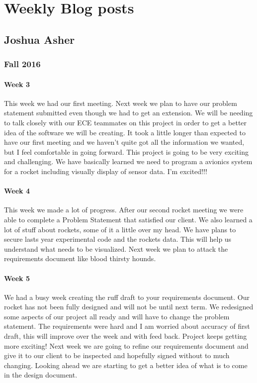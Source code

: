 \documentclass[10pt,draftclsnofoot,onecolumn,retainorgcmds]{IEEEtran}
\begin{document}
\section{Weekly Blog posts}
\subsection{Joshua Asher}
\subsubsection{Fall 2016}
\paragraph{Week 3}
 This week we had our first meeting. Next week we plan to have our problem statement submitted even though we had to get an extension. We will be needing to talk closely with our ECE teammates on this project in order to get a better idea of the software we will be creating. It took a little longer than expected to have our first meeting and we haven't quite got all the information we wanted, but I feel comfortable in going forward. This project is going to be very exciting and challenging. We have basically learned we need to program a avionics system for a rocket including visually display of sensor data. I'm excited!!! \\
\paragraph{Week 4}
This week we made a lot of progress. After our second rocket meeting we were able to complete a Problem Statement that satisfied our client. We also learned a lot of stuff about rockets, some of it a little over my head. We have plans to secure lasts year experimental code and the rockets data. This will help us understand what needs to be visualized. Next week we plan to attack the requirements document like blood thirsty hounds.\\	
\paragraph{Week 5}
We had a busy week creating the ruff draft to your requirements document. Our rocket has not been fully designed and will not be until next term. We redesigned some aspects of our project all ready and will have to change the problem statement. The requirements were hard and I am worried about accuracy of first draft, this will improve over the week and with feed back. Project keeps getting more exciting! Next week we are going to refine our requirements document and give it to our client to be inspected and hopefully signed without to much changing. Looking ahead we are starting to get a better idea of what is to come in the design document.\\
\end{document}
